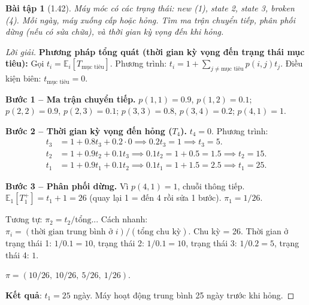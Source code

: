 \documentclass[8pt,a4paper]{article}
\newtheorem{exercise}{Bài tập}
\newenvironment{solution}{\begin{proof}[Lời giải]}{\end{proof}}
\newcommand{\E}{\mathbb{E}}
\begin{document}
\begin{exercise}[1.42]
Máy móc có các trạng thái: new (1), state 2, state 3, broken (4). Mỗi ngày, máy xuống cấp hoặc hỏng. Tìm ma trận chuyển tiếp, phân phối dừng (nếu có sửa chữa), và thời gian kỳ vọng đến khi hỏng.
\end{exercise}
\begin{solution}
\textbf{Phương pháp tổng quát (thời gian kỳ vọng đến trạng thái mục tiêu):} Gọi $t_i = \E_i[T_{\text{mục tiêu}}]$. Phương trình: $t_i = 1 + \sum_{j \neq \text{mục tiêu}} p(i,j) t_j$. Điều kiện biên: $t_{\text{mục tiêu}} = 0$.

\textbf{Bước 1 -- Ma trận chuyển tiếp.}
$p(1,1) = 0.9$, $p(1,2) = 0.1$; $p(2,2) = 0.9$, $p(2,3) = 0.1$; $p(3,3) = 0.8$, $p(3,4) = 0.2$; $p(4,1) = 1$.

\textbf{Bước 2 -- Thời gian kỳ vọng đến hỏng ($T_4$).}
$t_4 = 0$. Phương trình:
\begin{align*}
  t_3 &= 1 + 0.8 t_3 + 0.2 \cdot 0 \implies 0.2 t_3 = 1 \implies t_3 = 5. \\
  t_2 &= 1 + 0.9 t_2 + 0.1 t_3 \implies 0.1 t_2 = 1 + 0.5 = 1.5 \implies t_2 = 15. \\
  t_1 &= 1 + 0.9 t_1 + 0.1 t_2 \implies 0.1 t_1 = 1 + 1.5 = 2.5 \implies t_1 = 25.
\end{align*}

\textbf{Bước 3 -- Phân phối dừng.}
Vì $p(4,1)=1$, chuỗi thông tiếp. $\E_1[T_1^+] = t_1 + 1 = 26$ (quay lại 1 = đến 4 rồi sửa 1 bước). $\pi_1 = 1/26$.

Tương tự: $\pi_2 = t_2/\text{tổng}$... Cách nhanh: $\pi_i = (\text{thời gian trung bình ở } i)/(\text{tổng chu kỳ})$. Chu kỳ = 26. Thời gian ở trạng thái 1: $1/0.1 = 10$, trạng thái 2: $1/0.1 = 10$, trạng thái 3: $1/0.2 = 5$, trạng thái 4: $1$.

$\pi = (10/26,\ 10/26,\ 5/26,\ 1/26)$.

\textbf{Kết quả}: $t_1 = 25$ ngày. Máy hoạt động trung bình 25 ngày trước khi hỏng.
\end{solution}
\end{document}

